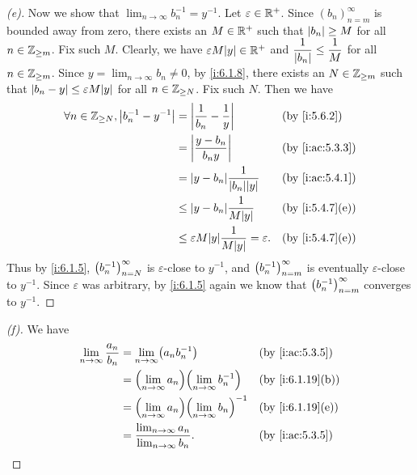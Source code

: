 \begin{proof}[(e)]
  Now we show that \(\lim_{n \to \infty} b_n^{-1} = y^{-1}\).
  Let \(\varepsilon \in \mathbb{R}^+\).
  Since \((b_n)_{n = m}^\infty\) is bounded away from zero, there exists an \(M \in \mathbb{R}^+\) such that \(\left\lvert b_n\right\rvert \geq M\) for all \(n \in \mathbb{Z}_{\geq m}\).
  Fix such \(M\).
  Clearly, we have \(\varepsilon M \abs{y} \in \R^+\) and \(\dfrac{1}{\left\lvert b_n\right\rvert} \leq \dfrac{1}{M}\) for all \(n \in \mathbb{Z}_{\geq m}\).
  Since \(y = \lim_{n \to \infty} b_n \neq 0\), by \cref{i:6.1.8}, there exists an \(N \in \mathbb{Z}_{\geq m}\) such that \(\abs{b_n - y} \leq \varepsilon M \abs{y}\) for all \(n \in \mathbb{Z}_{\geq N}\).
  Fix such \(N\).
  Then we have
  \begin{align*}
    \forall n \in \Z_{\geq N}, \abs{b_n^{-1} - y^{-1}} & = \abs{\dfrac{1}{b_n} - \dfrac{1}{y}}                       &  & \by{i:5.6.2}    \\
                                                       & = \abs{\dfrac{y - b_n}{b_n y}}                              &  & \by{i:ac:5.3.3} \\
                                                       & = \abs{y - b_n}\dfrac{1}{\abs{b_n}\abs{y}}                  &  & \by{i:ac:5.4.1} \\
                                                       & \leq \abs{y - b_n}\dfrac{1}{M\abs{y}}                       &  & \by{i:5.4.7}[e] \\
                                                       & \leq \varepsilon M\abs{y}\dfrac{1}{M\abs{y}} = \varepsilon. &  & \by{i:5.4.7}[e]
  \end{align*}
  Thus by \cref{i:6.1.5}, \(\left\lparen b_n^{-1}\right\rparen_{n = N}^\infty\) is \(\varepsilon\)-close to \(y^{-1}\), and \(\left\lparen b_n^{-1}\right\rparen_{n = m}^\infty\) is eventually \(\varepsilon\)-close to \(y^{-1}\).
  Since \(\varepsilon\) was arbitrary, by \cref{i:6.1.5} again we know that \(\left\lparen b_n^{-1}\right\rparen_{n = m}^\infty\) converges to \(y^{-1}\).
\end{proof}

\begin{proof}[(f)]
  We have
  \begin{align*}
    \lim_{n \to \infty} \dfrac{a_n}{b_n} & = \lim_{n \to \infty} \pa{a_n b_n^{-1}}                          &  & \by{i:ac:5.3.5}  \\
                                         & = \pa{\lim_{n \to \infty} a_n} \pa{\lim_{n \to \infty} b_n^{-1}} &  & \by{i:6.1.19}[b] \\
                                         & = \pa{\lim_{n \to \infty} a_n} \pa{\lim_{n \to \infty} b_n}^{-1} &  & \by{i:6.1.19}[e] \\
                                         & = \dfrac{\lim_{n \to \infty} a_n}{\lim_{n \to \infty} b_n}.      &  & \by{i:ac:5.3.5}
  \end{align*}
\end{proof}

